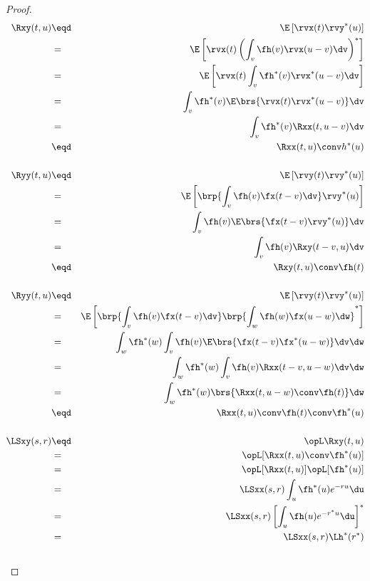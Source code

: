 \begin{proof}
\begin{eqnarray*}
   \Rxy(t,u)
     &\eqd& \E\left[\rvx(t) \rvy^\ast(u) \right]
   \\&=&    \E\left[\rvx(t) \left( \int_v \fh(v) \rvx(u-v)  \dv \right)^\ast \right]
   \\&=&    \E\left[\rvx(t) \int_v \fh^\ast(v) \rvx^\ast(u-v)  \dv \right]
   \\&=&    \int_v \fh^\ast(v)  \E\brs{\rvx(t)\rvx^\ast(u-v)} \dv
   \\&=&    \int_v \fh^\ast(v)  \Rxx(t,u-v)  \dv
   \\&\eqd& \Rxx(t,u) \conv h^\ast(u)
\\ \\
   \Ryy(t,u)
     &\eqd& \E\left[\rvy(t) \rvy^\ast(u) \right]
   \\&=&    \E\left[\brp{\int_v \fh(v) \fx(t-v)\dv}  \rvy^\ast(u) \right]
   \\&=&    \int_v \fh(v) \E\brs{\fx(t-v)\rvy^\ast(u)} \dv
   \\&=&    \int_v \fh(v) \Rxy(t-v,u) \dv
   \\&\eqd& \Rxy(t,u) \conv \fh(t)
\\ \\
   \Ryy(t,u)
     &\eqd& \E\left[\rvy(t) \rvy^\ast(u) \right]
   \\&=&    \E\left[\brp{\int_v \fh(v) \fx(t-v)\dv}
                    \brp{\int_w \fh(w) \fx(u-w)\dw}^\ast
              \right]
   \\&=&    \int_w \fh^\ast(w) \int_v \fh(v)
                   \E\brs{\fx(t-v)\fx^\ast(u-w)} \dv\dw
   \\&=&    \int_w \fh^\ast(w) \int_v \fh(v)
                   \Rxx(t-v,u-w) \dv\dw
   \\&=&    \int_w \fh^\ast(w) \brs{\Rxx(t,u-w)\conv\fh(t)}\dw
   \\&\eqd& \Rxx(t,u) \conv \fh(t) \conv \fh^\ast(u)
\\ \\
   \LSxy(s,r)
     &\eqd& \opL\Rxy(t,u)
   \\&=&    \opL[\Rxx(t,u) \conv \fh^\ast(u)]
   \\&=&    \opL[\Rxx(t,u)]\opL[\fh^\ast(u)]
   \\&=&    \LSxx(s,r)  \int_u \fh^\ast(u) e^{-ru}\du
   \\&=&    \LSxx(s,r)  \left[\int_u \fh(u) e^{-r^\ast u}\du \right]^\ast
   \\&=&    \LSxx(s,r) \Lh^\ast(r^\ast)
\\ \\

\end{eqnarray*}
\end{proof}
